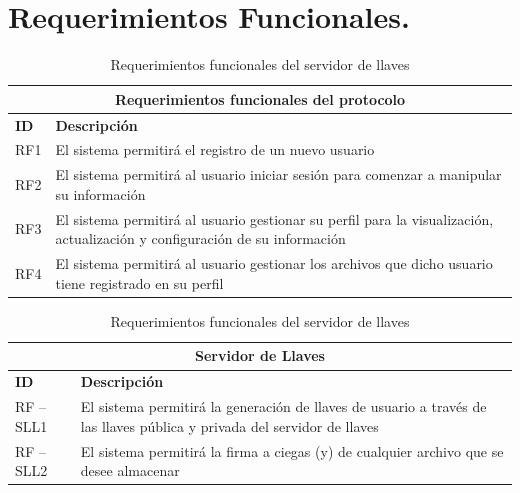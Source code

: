 \section{Requerimientos Funcionales. }

\begin{table}[htb]
\centering
\begin{tabular}{| p{2cm} |  p{13.5cm} |}
\hline
\multicolumn{2}{|c|}{\textbf{Requerimientos funcionales del protocolo}} \\ \hline
\textbf{ID} &  \textbf{Descripción} \\
\hline \hline
RF1 & El sistema permitirá el registro de un nuevo usuario \\ \hline
RF2 & El sistema permitirá al usuario iniciar sesión para comenzar a manipular su información \\ \hline
RF3 & El sistema permitirá al usuario gestionar su perfil para la visualización, actualización y configuración de su información \\ \hline
RF4 & El sistema permitirá al usuario gestionar los archivos que dicho usuario tiene registrado en su perfil \\ \hline

\end{tabular}
\caption{Requerimientos funcionales del servidor de llaves}
\label{Servidor de Llaves }
\end{table}




\begin{table}[htb]
\centering
\begin{tabular}{| p{2cm} |  p{13.5cm} |}
\hline
\multicolumn{2}{|c|}{\textbf{Servidor de Llaves}} \\ \hline
\textbf{ID} &  \textbf{Descripción} \\
\hline \hline
RF – SLL1 &El sistema permitirá la generación de llaves de usuario a través de las llaves pública y privada  del servidor de llaves \\ \hline
RF – SLL2 & El sistema permitirá la firma a ciegas (y) de cualquier archivo que se desee almacenar\\ \hline
\end{tabular}
\caption{Requerimientos funcionales del servidor de llaves}
\label{Servidor de Llaves }
\end{table}



